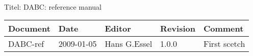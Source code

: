 \\Titel: DABC: reference manual
\begin{table}[h]
\begin{tabular}{|p{2.8cm}|p{2.0cm}|p{3.0cm}|p{1.6cm}|p{5.0cm}|} \hline
Document   & Date        & Editor       & Revision & Comment \\
\hline DABC-ref & 2009-01-05 & Hans G.Essel & 1.0.0      &
First scetch \\ \hline
\end{tabular}
\end{table}
